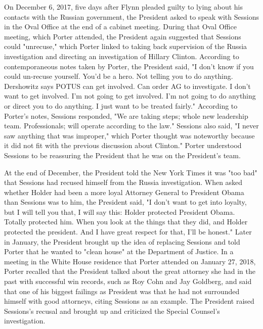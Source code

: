 On December 6, 2017, five days after Flynn pleaded guilty to lying about his contacts with the Russian government, the President asked to speak with Sessions in the Oval Office at the end of a cabinet meeting.%
During that Oval Office meeting, which Porter attended, the President again suggested that Sessions could "unrecuse," which Porter linked to taking back supervision of the Russia investigation and directing an investigation of Hillary Clinton.%
According to contemporaneous notes taken by Porter, the President said, "I don't know if you could un-recuse yourself.
You'd be a hero.
Not telling you to do anything.
Dershowitz says POTUS can get involved.
Can order AG to investigate.
I don't want to get involved.
I'm not going to get involved.
I'm not going to do anything or direct you to do anything.
I just want to be treated fairly."%
According to Porter's notes, Sessions responded, "We are taking steps; whole new leadership team.
Professionals; will operate according to the law."%
Sessions also said, "I never saw anything that was improper," which Porter thought was noteworthy because it did not fit with the previous discussion about Clinton."%
Porter understood Sessions to be reassuring the President that he was on the President's team.%

At the end of December, the President told the New York Times it was "too bad" that Sessions had recused himself from the Russia investigation.%
When asked whether Holder had been a more loyal Attorney General to President Obama than Sessions was to him, the President said, "I don't want to get into loyalty, but I will tell you that, I will say this: Holder protected President Obama.
Totally protected him.
When you look at the things that they did, and Holder protected the president.
And I have great respect for that, I'll be honest."%
Later in January, the President brought up the idea of replacing Sessions and told Porter that he wanted to "clean house" at the Department of Justice.%
In a meeting in the White House residence that Porter attended on January 27, 2018, Porter recalled that the President talked about the great attorney she had in the past with successful win records, such as Roy Cohn and Jay Goldberg, and said that one of his biggest failings as President was that he had not surrounded himself with good attorneys, citing Sessions as an example.%
The President raised Sessions's recusal and brought up and criticized the Special Counsel's investigation.%

